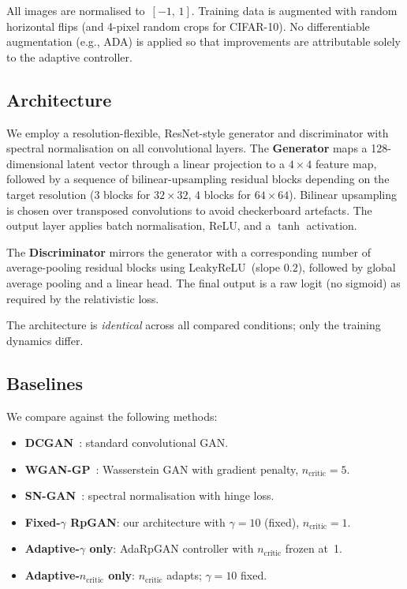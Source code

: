 \documentclass{article}
\newcommand{\ncritic}{n_{\mathrm{critic}}}
\begin{document}
All images are normalised to~$[-1,\,1]$. Training data is augmented with random horizontal flips (and 4-pixel random crops for CIFAR-10). No differentiable augmentation (e.g., ADA) is applied so that improvements are attributable solely to the adaptive controller.

\subsection{Architecture}

We employ a resolution-flexible, ResNet-style generator and discriminator with spectral normalisation on all convolutional layers. The \textbf{Generator} maps a 128-dimensional latent vector through a linear projection to a $4{\times}4$ feature map, followed by a sequence of bilinear-upsampling residual blocks depending on the target resolution (3 blocks for $32{\times}32$, 4 blocks for $64{\times}64$). Bilinear upsampling is chosen over transposed convolutions to avoid checkerboard artefacts. The output layer applies batch normalisation, ReLU, and a $\tanh$ activation.

The \textbf{Discriminator} mirrors the generator with a corresponding number of average-pooling residual blocks using LeakyReLU~(slope $0.2$), followed by global average pooling and a linear head. The final output is a raw logit (no sigmoid) as required by the relativistic loss.

The architecture is \emph{identical} across all compared conditions; only the training dynamics differ.

\subsection{Baselines}

We compare against the following methods:
\begin{itemize}
    \item \textbf{DCGAN}~\cite{radford2016unsupervised}: standard convolutional GAN.
    \item \textbf{WGAN-GP}~\cite{gulrajani2017improved}: Wasserstein GAN with gradient penalty, $\ncritic=5$.
    \item \textbf{SN-GAN}~\cite{miyato2018spectral}: spectral normalisation with hinge loss.
    \item \textbf{Fixed-$\gamma$ RpGAN}: our architecture with $\gamma=10$ (fixed), $\ncritic=1$.
    \item \textbf{Adaptive-$\gamma$ only}: AdaRpGAN controller with $\ncritic$ frozen at~1.
    \item \textbf{Adaptive-$\ncritic$ only}: $\ncritic$ adapts; $\gamma=10$ fixed.
\end{itemize}
\end{document}
